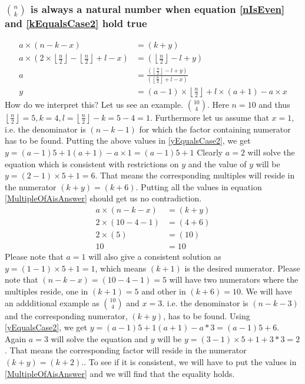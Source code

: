 \documentclass[10pt, twoside]{article}
\newcommand*{\Combination}[2]{\binom{#1}{#2}}%
\newcommand{\floordivision}[2]{\left\lfloor \frac{#1}{#2} \right\rfloor}
\begin{document}
\subsubsection{$\Combination{n}{k}$ is always a natural number when equation \eqref{nIsEven} and \eqref{kEqualsCase2} hold true}\label{ProofkEqualsCase2}
\begin{align}
	a \times (n-k-x) &= (k+y) \nonumber \\
	a \times (2\times \floordivision{n}{2} - \floordivision{n}{2} + l - x) &= (\floordivision{n}{2} - l + y) \nonumber \\
	a &= \frac{(\floordivision{n}{2} - l + y)}{(\floordivision{n}{2} + l - x)} \nonumber \\
	y &= (a-1)\times \floordivision{n}{2} + l \times (a+1) - a\times x \label{yEqualsCase2}	
\end{align}
How do we interpret this? Let us see an example. \newline
$\Combination{10}{4}$. Here $n = 10$ and thus $\floordivision{n}{2} = 5, k = 4, l = \floordivision{n}{2} - k = 5 -4 = 1$. Furthermore let us assume that $x = 1$, i.e. the denominator is $(n-k-1)$ for which the factor containing numerator has to be found.\newline
Putting the above values in \eqref{yEqualsCase2}, we get
$y = (a-1)5+1(a+1)-a\times 1 = (a-1)5+1$\newline
Clearly $a = 2$ will solve the equation which is consistent with restrictions on $y$ and the value of $y$ will be $y=(2-1)\times5 + 1=6$. That means the corresponding multiples will reside in the numerator $(k+y)=(k+6)$.\newline
Putting all the values in equation \eqref{MultipleOfAisAnswer} should get us no contradiction.
\begin{align}
	a \times (n-k-x) &= (k+y) \nonumber \\
	2 \times (10-4-1) &= (4+6) \nonumber \\
	2 \times (5) &= (10) \nonumber \\
	10 &= 10 \nonumber
\end{align}
Please note that $a = 1$ will also give a consistent solution as $y=(1-1)\times5 + 1=1$, which means $(k+1)$ is the desired numerator. Please note that $(n-k-x)=(10-4-1)=5$ will have two numerators where the multiples reside, one in $(k+1)=5$ and other in $(k+6)=10$.
We will have an addditional example as $\Combination{10}{4}$ and $x = 3$. i.e. the denominator is $(n-k-3)$ and the corresponding numerator, $(k+y)$, has to be found. Using \eqref{yEqualsCase2}, we get $y = (a-1)5+1(a+1)-a*3 = (a-1)5+6$\newline. Again $a=3$ will solve the equation and $y$ will be $y=(3-1)\times5 +1+ 3*3=2$. That means the corresponding factor will reside in the numerator $(k+y)=(k+2)$.\newline. To see if it is consistent, we will have to put the values in \eqref{MultipleOfAisAnswer} and we will find that the equality holds.
\end{document}

